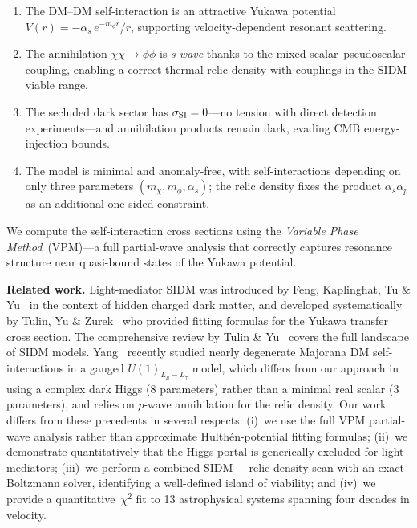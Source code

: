 \documentclass[aps,prd,twocolumn,superscriptaddress,nofootinbib]{revtex4-2}
\newcommand{\mchi}{m_\chi}
\newcommand{\mphi}{m_\phi}
\newcommand{\siSI}{\sigma_{\rm SI}}
\begin{document}
\begin{enumerate}
\item The DM--DM self-interaction is an attractive Yukawa potential
  $V(r)=-\alpha_s\,e^{-\mphi r}/r$, supporting velocity-dependent
  resonant scattering.
\item The annihilation $\chi\chi\to\phi\phi$ is \emph{s-wave} thanks
  to the mixed scalar--pseudoscalar coupling, enabling a correct
  thermal relic density with couplings in the SIDM-viable range.
\item The secluded dark sector has $\siSI=0$---no tension with direct
  detection experiments---and annihilation products remain dark,
  evading CMB energy-injection bounds.
\item The model is minimal and anomaly-free, with self-interactions
  depending on only three parameters
  $(\mchi,\mphi,\alpha_s)$; the relic density fixes the
  product $\alpha_s\alpha_p$ as an additional one-sided constraint.
\end{enumerate}

We compute the self-interaction cross sections using the
\emph{Variable Phase Method}~(VPM)---a full partial-wave analysis that
correctly captures resonance structure near quasi-bound states of the
Yukawa potential.

\textbf{Related work.}  Light-mediator SIDM was introduced by Feng,
Kaplinghat, Tu \& Yu~\cite{Feng:2009mn} in the context of hidden
charged dark matter, and developed systematically by Tulin, Yu \&
Zurek~\cite{Tulin:2013teo} who provided fitting formulas for the
Yukawa transfer cross section.  The comprehensive review by Tulin \&
Yu~\cite{Tulin:2017ara} covers the full landscape of SIDM models.
Yang~\cite{Yang:2025abc} recently studied nearly degenerate Majorana DM
self-interactions in a gauged $U(1)_{L_\mu-L_\tau}$ model, which
differs from our approach in using a complex dark Higgs (8 parameters)
rather than a minimal real scalar (3 parameters), and relies on $p$-wave
annihilation for the relic density.  Our work differs from these
precedents in several respects: (i)~we use the full VPM partial-wave
analysis rather than approximate Hulth\'{e}n-potential fitting formulas;
(ii)~we demonstrate quantitatively that the Higgs portal is generically
excluded for light mediators; (iii)~we perform a combined SIDM + relic
density scan with an exact Boltzmann solver, identifying a well-defined
island of viability; and (iv)~we provide a quantitative~$\chi^{2}$ fit
to 13 astrophysical systems spanning four decades in velocity.
\end{document}
